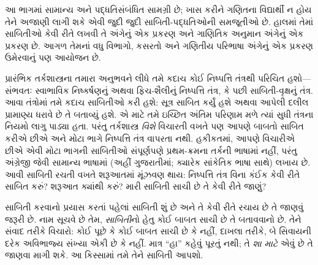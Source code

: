 
\label{guunit:OLP-0601}


\begin{editorial}
  આ ભાગમાં સામાન્ય અને પદ્ધતિસંબંધિત સામગ્રી છે;
  ખાસ કરીને ગણિતના વિદ્યાર્થી ન હોય તેને અજાણી લાગી શકે
  એવી જુદી જુદી સાબિતી-પદ્ધતિઓની સમજૂતીઓ છે. હાલમાં
  તેમાં સાબિતીઓ કેવી રીતે લખવી તે અંગેનું એક પ્રકરણ
  અને ગાણિતિક અનુમાન અંગેનું એક પ્રકરણ છે. આગળ
  તેમનાં વધુ વિભાગો, કસરતો અને ગણિતીય પરિભાષા
  અંગેનું એક પ્રકરણ ઉમેરવાનું પણ આયોજન છે.
\end{editorial}

\begingroup
\makeatletter{}\makeatother

\label{guunit:OLP-0602}


\begingroup
\makeatletter{}\makeatother


\label{guunit:OLP-0603}


પ્રારંભિક તર્કશાસ્ત્રના તમારા અનુભવને લીધે તમે કદાચ કોઈ
નિષ્પત્તિ તંત્રથી પરિચિત હશો---સંભવતઃ સ્વાભાવિક નિષ્કર્ષણનું
અથવા ફિચ-શૈલીનું નિષ્પત્તિ તંત્ર, કે પછી સાબિતી-વૃક્ષનું તંત્ર.
આવા તંત્રોમાં તમે કદાચ સાબિતીઓ કરી હશે: સૂત્ર સાબિત કર્યું
હશે અથવા આપેલી દલીલ પ્રામાણ્ય ધરાવે છે તે બતાવ્યું હશે. એ માટે તમે
ઇચ્છિત અંતિમ પરિણામ મળે ત્યાં સુધી તંત્રના નિયમો લાગુ પાડ્યા હતા.
પરંતુ તર્કશાસ્ત્ર \emph{વિશે} વિચારતી વખતે પણ આપણે બાબતો સાબિત કરીએ
છીએ અને મોટા ભાગે નિષ્પત્તિ તંત્ર વાપરતા નથી. હકીકતમાં, આપણે
વિચારીએ છીએ એવી મોટા ભાગની સાબિતીઓ સંપૂર્ણપણે પ્રથમ-ક્રમના તર્કની
ભાષામાં નહીં, પરંતુ અંગ્રેજી જેવી સામાન્ય ભાષામાં (અહીં ગુજરાતીમાં;
ક્યારેક સાંકેતિક ભાષા સાથે) લખાય છે. આવી સાબિતી રચતી વખતે શરૂઆતમાં
મૂંઝવણ થાય: નિષ્પત્તિ તંત્ર વિના કંઈક કેવી રીતે સાબિત કરું?
શરૂઆત ક્યાંથી કરું? મારી સાબિતી સાચી છે તે કેવી રીતે જાણું?

સાબિતી કરવાનો પ્રયાસ કરતાં પહેલાં સાબિતી શું છે અને તે કેવી રીતે
રચાય છે તે જાણવું જરૂરી છે. નામ સૂચવે છે તેમ, \emph{સાબિતી}નો
હેતુ કોઈ બાબત સાચી છે તે બતાવવાનો છે. તેને સંવાદ તરીકે વિચારો:
કોઈ પૂછે કે કોઈ બાબત સાચી છે કે નહીં, દાખલા તરીકે, બે સિવાયની
દરેક અવિભાજ્ય સંખ્યા એકી છે કે નહીં. માત્ર ``હા'' કહેવું પૂરતું
નથી; તે \emph{શા માટે} એવું છે તે જાણવા માગી શકે. આ કિસ્સામાં તમે
તેને સાબિતી આપશો.

